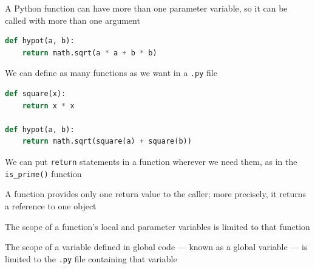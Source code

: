 \documentclass[8pt,a4paper,compress]{beamer}
\begin{document}
\begin{frame}[fragile]
\pause

A Python function can have more than one parameter variable, so it can be called with more than one argument
\begin{lstlisting}[language=Python]
def hypot(a, b):
    return math.sqrt(a * a + b * b)
\end{lstlisting}

\pause
\bigskip

We can define as many functions as we want in a \lstinline{.py} file
\begin{lstlisting}[language=Python]
def square(x):
    return x * x

def hypot(a, b):
    return math.sqrt(square(a) + square(b))
\end{lstlisting}

\pause
\bigskip

We can put \lstinline{return} statements in a function wherever we need them, as in the \lstinline{is_prime()} function

\pause
\bigskip

A function provides only one return value to the caller; more precisely, it returns a reference to one object

\pause
\bigskip

The scope of a function's local and parameter variables is limited to that function

\pause
\bigskip

The scope of a variable defined in global code --- known as a global variable --- is limited to the \lstinline{.py} file containing that variable
\end{frame}
\end{document}
